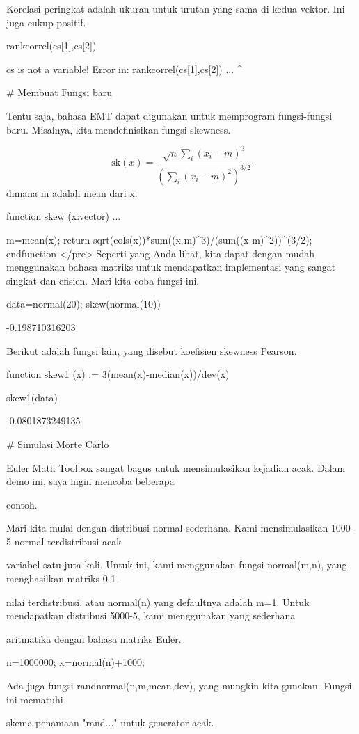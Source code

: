 \documentclass{article}
\begin{document}
Korelasi peringkat adalah ukuran untuk urutan yang sama di kedua
vektor. Ini juga cukup positif.


\>rankcorrel(cs[1],cs[2])


    cs is not a variable!
    Error in:
    rankcorrel(cs[1],cs[2]) ...
                    ^

# Membuat Fungsi baru

Tentu saja, bahasa EMT dapat digunakan untuk memprogram fungsi-fungsi
baru. Misalnya, kita mendefinisikan fungsi skewness.


$$\text{sk}(x) = \dfrac{\sqrt{n} \sum_i (x_i-m)^3}{\left(\sum_i (x_i-m)^2\right)^{3/2 }}$$dimana m adalah mean dari x.


\>function skew (x:vector) ...


    m=mean(x);
    return sqrt(cols(x))*sum((x-m)^3)/(sum((x-m)^2))^(3/2);
    endfunction
</pre>
Seperti yang Anda lihat, kita dapat dengan mudah menggunakan bahasa
matriks untuk mendapatkan implementasi yang sangat singkat dan
efisien. Mari kita coba fungsi ini.


\>data=normal(20); skew(normal(10))


    -0.198710316203

Berikut adalah fungsi lain, yang disebut koefisien skewness Pearson.


\>function skew1 (x) := 3\*(mean(x)-median(x))/dev(x)

\>skew1(data)


    -0.0801873249135

# Simulasi Morte Carlo

Euler Math Toolbox sangat bagus untuk mensimulasikan kejadian acak.
Dalam demo ini, saya ingin mencoba beberapa


contoh.


Mari kita mulai dengan distribusi normal sederhana. Kami
mensimulasikan 1000-5-normal terdistribusi acak


variabel satu juta kali. Untuk ini, kami menggunakan fungsi
normal(m,n), yang menghasilkan matriks 0-1-


nilai terdistribusi, atau normal(n) yang defaultnya adalah m=1. Untuk
mendapatkan distribusi 5000-5, kami menggunakan yang sederhana


aritmatika dengan bahasa matriks Euler.


\>n=1000000; x=normal(n)+1000;


Ada juga fungsi randnormal(n,m,mean,dev), yang mungkin kita gunakan.
Fungsi ini mematuhi


skema penamaan "rand..." untuk generator acak.
\end{document}
